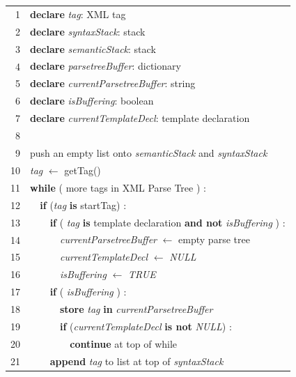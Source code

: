 \begin{figure}[ph]
   \centering
   \scriptsize
   \begin{tabular}{m{}m{}}
 ~1 & \verb++\textsf{\textbf{declare} \emph{tag}: XML tag} \\
 ~2 & \verb++\textsf{\textbf{declare} \emph{syntaxStack}: stack} \\
 ~3 & \verb++\textsf{\textbf{declare} \emph{semanticStack}: stack } \\
 ~4 & \verb++\textsf{\textbf{declare} \emph{parsetreeBuffer}: dictionary} \\
 ~5 & \verb++\textsf{\textbf{declare} \emph{currentParsetreeBuffer}: string} \\
 ~6 & \verb++\textsf{\textbf{declare} \emph{isBuffering}: boolean} \\
 ~7 & \verb++\textsf{\textbf{declare} \emph{currentTemplateDecl}: template declaration} \\
 ~8 & \\
 ~9 & \verb++\textsf{push an empty list onto \emph{semanticStack} and \emph{syntaxStack} } \\
 10 & \verb++\textsf{\emph{tag} $\leftarrow$ getTag()} \\
 11 & \verb++\textsf{\textbf{while} ( more tags in XML Parse Tree ) :} \\
 12 & \verb+  +\textsf{\textbf{if} (\emph{tag} \textbf{is} startTag) :} \\
 13 & \verb+    +\textsf{\textbf{if} ( \emph{tag} \textbf{is} template declaration \textbf{and not} \emph{isBuffering} ) :} \\
 14 & \verb+      +\textsf{\emph{currentParsetreeBuffer} $\leftarrow$ empty parse tree} \\
 15 & \verb+      +\textsf{\emph{currentTemplateDecl} $\leftarrow$ \emph{NULL}} \\
 16 & \verb+      +\textsf{\emph{isBuffering} $\leftarrow$ \emph{TRUE}} \\
 17 & \verb+    +\textsf{\textbf{if} ( \emph{isBuffering} ) :} \\
 18 & \verb+      +\textsf{\textbf{store} \emph{tag} \textbf{in} \emph{currentParsetreeBuffer}} \\
 19 & \verb+      +\textsf{\textbf{if} (\emph{currentTemplateDecl} \textbf{is not} \emph{NULL}) : } \\
 20 & \verb+        +\textsf{\textbf{continue} at top of while } \\
 21 & \verb+    +\textsf{\textbf{append} \emph{tag} to list at top of \emph{syntaxStack} } \\

\end{tabular}
\end{figure}
